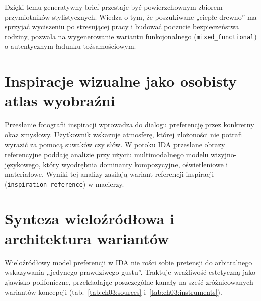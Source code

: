 Dzięki temu generatywny brief przestaje być powierzchownym zbiorem przymiotników stylistycznych. Wiedza o tym, że poszukiwane „ciepłe drewno” ma sprzyjać wyciszeniu po stresującej pracy i budować poczucie bezpieczeństwa rodziny, pozwala na wygenerowanie wariantu funkcjonalnego (\texttt{mixed\_functional}) o autentycznym ładunku tożsamościowym.

\section{Inspiracje wizualne jako osobisty atlas wyobraźni}
\label{ch03:sec:inspiracje}

Przesłanie fotografii inspiracji wprowadza do dialogu preferencję przez konkretny okaz zmysłowy. Użytkownik wskazuje atmosferę, której złożoności nie potrafi wyrazić za pomocą suwaków czy słów.
W potoku IDA przesłane obrazy referencyjne poddaję analizie przy użyciu multimodalnego modelu wizyjno-językowego, który wyodrębnia dominanty kompozycyjne, oświetleniowe i materiałowe. Wyniki tej analizy zasilają wariant referencji inspiracji (\texttt{inspiration\_reference}) w macierzy.

\section{Synteza wieloźródłowa i architektura wariantów}
\label{ch03:sec:synteza}

Wieloźródłowy model preferencji w IDA nie rości sobie pretensji do arbitralnego wskazywania „jedynego prawdziwego gustu”. Traktuje wrażliwość estetyczną jako zjawisko polifoniczne, przekładając poszczególne kanały na sześć zróżnicowanych wariantów koncepcji (tab.~\ref{tab:ch03:sources} i~\ref{tab:ch03:instruments}).

